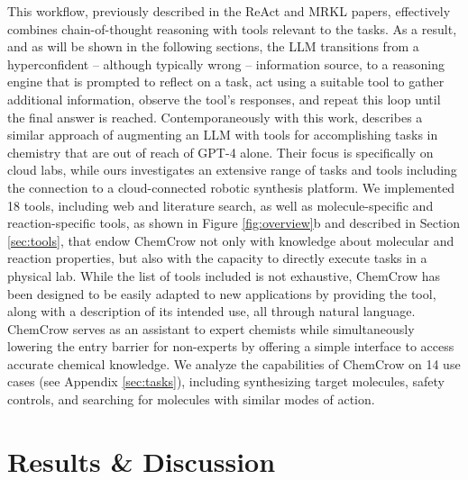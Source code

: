 \documentclass[10pt]{article}
\begin{document}
This workflow, previously described in the ReAct\cite{yao2022react} and MRKL\citep{karpas2022mrkl} papers, effectively combines chain-of-thought reasoning with tools relevant to the tasks. As a result, and as will be shown in the following sections, the LLM transitions from a hyperconfident -- although typically wrong -- information source, to a reasoning engine that is prompted to reflect on a task, act using a suitable tool to gather additional information, observe the tool's responses, and repeat this loop until the final answer is reached. Contemporaneously with this work, \cite{Boiko2023} describes a similar approach of augmenting an LLM with tools for accomplishing tasks in chemistry that are out of reach of GPT-4 alone. Their focus is specifically on cloud labs, while ours investigates an extensive range of tasks and tools including the connection to a cloud-connected robotic synthesis platform. We implemented 18 tools, including web and literature search, as well as molecule-specific and reaction-specific tools, as shown in Figure \ref{fig:overview}b and described in Section \ref{sec:tools}, that endow ChemCrow not only with knowledge about molecular and reaction properties, but also with the capacity to directly execute tasks in a physical lab. While the list of tools included is not exhaustive, ChemCrow has been designed to be easily adapted to new applications by providing the tool, along with a description of its intended use, all through natural language. 
ChemCrow serves as an assistant to expert chemists while simultaneously lowering the entry barrier for non-experts by offering a simple interface to access accurate chemical knowledge. We analyze the capabilities of ChemCrow on 14 use cases (see Appendix \ref{sec:tasks}), including synthesizing target molecules, safety controls, and searching for molecules with similar modes of action. 

\section{Results \& Discussion}
\end{document}
